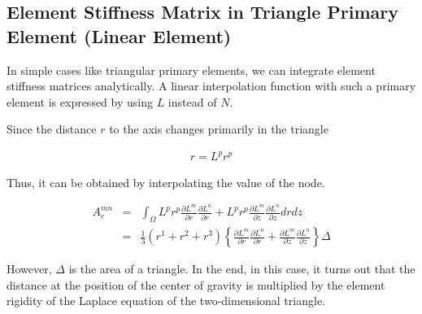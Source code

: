 \subsection{Element Stiffness Matrix in Triangle Primary Element (Linear Element)}

In simple cases like triangular primary elements, we can integrate element stiffness matrices analytically. A linear interpolation function with such a primary element is expressed by using $L$ instead of $N$.

Since the distance $r$ to the axis changes primarily in the triangle

\begin{eqnarray}
r = L^p r^p
\end{eqnarray}

Thus, it can be obtained by interpolating the value of the node.

\begin{eqnarray}
A_e^{mn}
&=&\int_\Omega L^pr^p\frac{\partial L^m}{\partial r}\frac{\partial  L^n}{\partial r} + L^pr^p\frac{\partial L^m}{\partial z}\frac{\partial L^n}{\partial z} drdz\\
&=& \frac{1}{3}(r^1+r^2+r^3)\left\{\frac{\partial L^m}{\partial r}\frac{\partial  L^n}{\partial r} + \frac{\partial L^m}{\partial z}\frac{\partial L^n}{\partial z} \right\}\Delta
\end{eqnarray}


However, $\Delta$ is the area of ​​a triangle. In the end, in this case, it turns out that the distance at the position of the center of gravity is multiplied by the element rigidity of the Laplace equation of the two-dimensional triangle.



